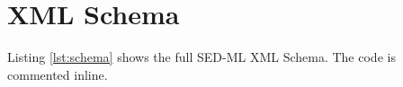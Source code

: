 \chapter{XML Schema}
Listing \ref{lst:schema} shows the full SED-ML XML Schema. The code is commented inline.
\label{sec:xmlschema}
